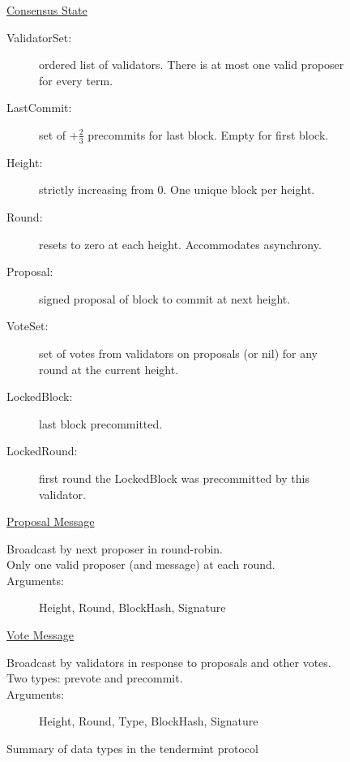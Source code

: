 \begin{figure}[]
	\underline{Consensus State}
		\begin{description}
			\item[ValidatorSet:] ordered list of validators. There is at most one valid proposer for every term.
			\item[LastCommit:] set of $+\frac{2}{3}$ precommits for last block. Empty for first block.
			\item[Height:] strictly increasing from 0. One unique block per height.
			\item[Round:] resets to zero at each height. Accommodates asynchrony. 
			\item[Proposal:] signed proposal of block to commit at next height.
			\item[VoteSet:] set of votes from validators on proposals (or nil) for any round at the current height.
			\item[LockedBlock:] last block precommitted.
			\item[LockedRound:] first round the LockedBlock was precommitted by this validator.
		\end{description}

	\underline{Proposal Message}
		\begin{description}
			\item[Broadcast by next proposer in round-robin.]
			\item[Only one valid proposer (and message) at each round.]
			\item[Arguments:] Height, Round, BlockHash, Signature
		\end{description}

	\underline{Vote Message}
		\begin{description}
			\item[Broadcast by validators in response to proposals and other votes.]
			\item[Two types: prevote and precommit.]
			\item[Arguments:] Height, Round, Type, BlockHash, Signature
		\end{description}

	\caption[Summary of tendermint protocol]{Summary of data types in the tendermint protocol}
	\label{fig:tendermint_summary}
\end{figure}


